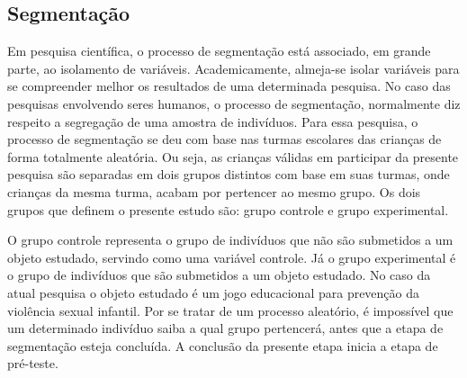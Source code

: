 \subsection{Segmentação}\label{subsec:segmentacao}

Em pesquisa científica, o processo de segmentação está associado, em grande parte, ao isolamento de variáveis. Academicamente, almeja-se isolar variáveis para se compreender melhor os resultados de uma determinada pesquisa. No caso das pesquisas envolvendo seres humanos, o processo de segmentação, normalmente diz respeito a segregação de uma amostra de indivíduos. Para essa pesquisa, o processo de segmentação se deu com base nas turmas escolares das crianças de forma totalmente aleatória. Ou seja, as crianças válidas em participar da presente pesquisa são separadas em dois grupos distintos com base em suas turmas, onde crianças da mesma turma, acabam por pertencer ao mesmo grupo. Os dois grupos que definem o presente estudo são: grupo controle e grupo experimental. 

O grupo controle representa o grupo de indivíduos que não são submetidos a um objeto estudado, servindo como uma variável controle. Já o grupo experimental é o grupo de indivíduos que são submetidos a um objeto estudado. No caso da atual pesquisa o objeto estudado é um jogo educacional para prevenção da violência sexual infantil. Por se tratar de um processo aleatório, é impossível que um determinado indivíduo saiba a qual grupo pertencerá, antes que a etapa de segmentação esteja concluída. A conclusão da presente etapa inicia a etapa de pré-teste. 



